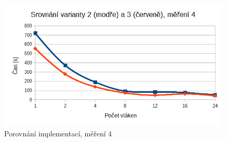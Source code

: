 \documentclass[12pt]{article}
\begin{document}
\begin{figure}
  \begin{center}
      \includegraphics[width=12cm]{images/vs4.png}	
    \caption{Porovnání implementací, měření 4}
  \end{center}
\end{figure}
\end{document}
